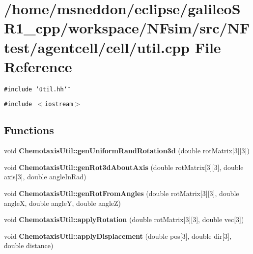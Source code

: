 \section{/home/msneddon/eclipse/galileoSR1\_\-cpp/workspace/NFsim/src/NFtest/agentcell/cell/util.cpp File Reference}
\label{util_8cpp}


{\tt \#include \char`\"{}util.hh\char`\"{}}\par
{\tt \#include $<$iostream$>$}\par
\subsection*{Functions}
\begin{CompactItemize}
\item 
void {\bf ChemotaxisUtil::genUniformRandRotation3d} (double rotMatrix[3][3])
\item 
void {\bf ChemotaxisUtil::genRot3dAboutAxis} (double rotMatrix[3][3], double axis[3], double angleInRad)
\item 
void {\bf ChemotaxisUtil::genRotFromAngles} (double rotMatrix[3][3], double angleX, double angleY, double angleZ)
\item 
void {\bf ChemotaxisUtil::applyRotation} (double rotMatrix[3][3], double vec[3])
\item 
void {\bf ChemotaxisUtil::applyDisplacement} (double pos[3], double dir[3], double distance)
\end{CompactItemize}
